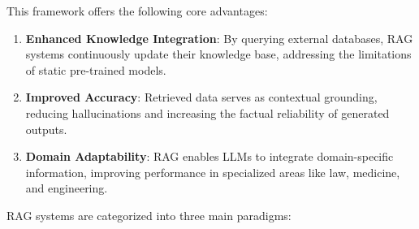 This framework offers the following core advantages:

\begin{enumerate}

	\item \textbf{Enhanced Knowledge Integration}: By querying external databases, RAG systems continuously update their knowledge base, addressing the limitations of static pre-trained models.

	\item \textbf{Improved Accuracy}: Retrieved data serves as contextual grounding, reducing hallucinations and increasing the factual reliability of generated outputs.

	\item \textbf{Domain Adaptability}: RAG enables LLMs to integrate domain-specific information, improving performance in specialized areas like law, medicine, and engineering.

\end{enumerate}

RAG systems are categorized into three main paradigms:

